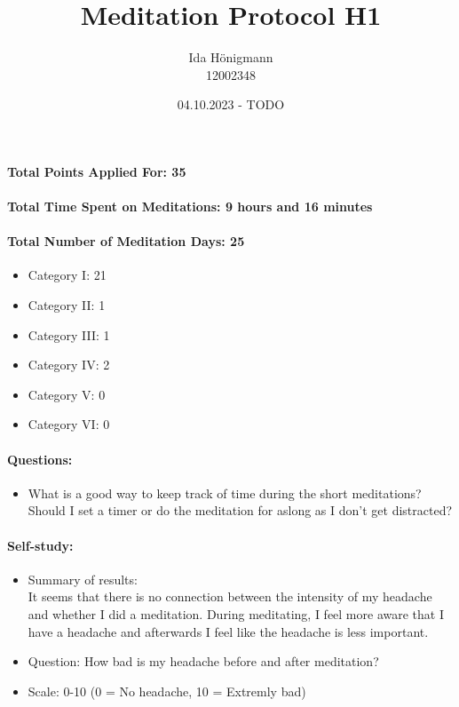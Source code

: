 \documentclass[11pt,a4paper]{article}
\begin{document}
\afterpage{\restorepagecolor}
\title{\LARGE\bfseries Meditation Protocol H1}
\author{Ida Hönigmann \\ 12002348}
\date{04.10.2023 - TODO}
\maketitle

\paragraph{Total Points Applied For: 35}
\paragraph{Total Time Spent on Meditations: 9 hours and 16 minutes}
\paragraph{Total Number of Meditation Days: 25}

\begin{itemize}
    \item Category I: 21
    \item Category II: 1
    \item Category III: 1
    \item Category IV: 2
    \item Category V: 0
    \item Category VI: 0
\end{itemize}

\paragraph{Questions:}
\begin{itemize}
    \item What is a good way to keep track of time during the short meditations? Should I set a timer or do the meditation for aslong as I don't get distracted?
\end{itemize}

\paragraph{Self-study:}
\begin{itemize}
    \item Summary of results:\\
    It seems that there is no connection between the intensity of my headache and whether I did a meditation. During meditating, I feel more aware that I have a headache and afterwards I feel like the headache is less important.
    \item Question: How bad is my headache before and after meditation?
    \item Scale: 0-10 (0 = No headache, 10 = Extremly bad)
\end{itemize}
\end{document}
